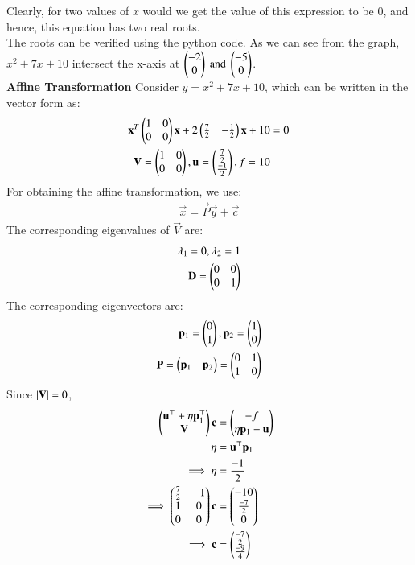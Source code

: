 \documentclass[journal,12pt,twocolumn]{IEEEtran}
\begin{document}
Clearly, for two values of $x$ would we get the value of this expression to be $0$, and hence, this equation has two real roots.\\
The roots can be verified using the python code. As we can see from the graph, $x^2+7x+10$ intersect the x-axis at ${\begin{pmatrix}-2\\0\end{pmatrix}\text{ and }\begin{pmatrix}-5\\0\end{pmatrix}}$.\\
\textbf{Affine Transformation}
Consider $y = x^2+7x+10$, which can be written in the vector form as:
\begin{align}
\mathbf{x}^T\begin{pmatrix}1 & 0 \\ 0 & 0\end{pmatrix}\mathbf{x} + 2\begin{pmatrix}\frac{7}{2} & -\frac{1}{2}\end{pmatrix}\mathbf{x} + 10 &= 0 \\
\mathbf{V} = \begin{pmatrix}1 & 0\\0 & 0\end{pmatrix} , \mathbf{u} = \begin{pmatrix}\frac{7}{2}\\ \frac{-1}{2}\end{pmatrix} , f = 10
\end{align}
For obtaining the affine transformation, we use:
\begin{align}
    \vec{x} = \vec{P}\vec{y} + \vec{c}
\end{align}
The corresponding eigenvalues of $\vec{V}$ are:
\begin{align}
    \lambda_1 = 0 , \lambda_2 = 1\\
    \mathbf{D} = \begin{pmatrix}0 & 0\\0 & 1\end{pmatrix}
\end{align}
The corresponding eigenvectors are:
\begin{align}
    \mathbf{p}_1 = \begin{pmatrix}0\\1\end{pmatrix} , \mathbf{p}_2 = \begin{pmatrix}1\\0\end{pmatrix}\\
    \mathbf{P} = \begin{pmatrix}\mathbf{p}_1 & \mathbf{p}_2\end{pmatrix} = \begin{pmatrix}0 & 1\\1 & 0\end{pmatrix}
\end{align}
Since $\vert\mathbf{V}\vert = 0$,
\begin{align}
    \begin{pmatrix}\mathbf{u}^\top+\eta \mathbf{p}_1^\top\\\mathbf{V}\end{pmatrix}\mathbf{c} &= \begin{pmatrix}-f\\\eta \mathbf{p}_1-\mathbf{u}\end{pmatrix}\\
    \eta &= \mathbf{u}^\top \mathbf{p}_1\\
    \implies \eta &= \frac{-1}{2}\\
    \implies \begin{pmatrix}\frac{7}{2}&-1\\1&0\\0&0\end{pmatrix}\mathbf{c} &= \begin{pmatrix}-10\\\frac{-7}{2}\\0\end{pmatrix}\\
    \implies \mathbf{c} &= \begin{pmatrix}\frac{-7}{2}\\\frac{-9}{4}\end{pmatrix}
\end{align}
\end{document}
